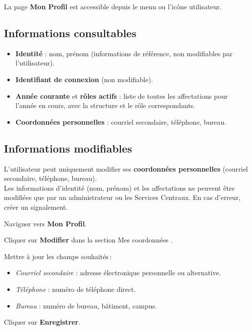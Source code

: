 La page \textbf{Mon Profil} est accessible depuis le menu ou l'ic\^one utilisateur.

\subsection{Informations consultables}

\begin{itemize}
  \item \textbf{Identit\'e} : nom, pr\'enom (informations de r\'ef\'erence, non modifiables par l'utilisateur).
  \item \textbf{Identifiant de connexion} (non modifiable).
  \item \textbf{Ann\'ee courante} et \textbf{r\^oles actifs} : liste de toutes les affectations pour l'ann\'ee en cours, avec la structure et le r\^ole correspondants.
  \item \textbf{Coordonn\'ees personnelles} : courriel secondaire, t\'el\'ephone, bureau.
\end{itemize}

\subsection{Informations modifiables}

\begin{warnbox}
  L'utilisateur peut uniquement modifier ses \textbf{coordonn\'ees personnelles} (courriel secondaire, t\'el\'ephone, bureau). \\
  Les informations d'identit\'e (nom, pr\'enom) et les affectations ne peuvent \^etre modifi\'ees que par un administrateur ou les Services Centraux. En cas d'erreur, cr\'eer un signalement.
\end{warnbox}

\begin{steps}
  \item Naviguer vers \textbf{Mon Profil}.
  \item Cliquer sur \textbf{Modifier} dans la section \og Mes coordonn\'ees \fg{}.
  \item Mettre \`a jour les champs souhait\'es\,:
    \begin{itemize}
      \item \textit{Courriel secondaire} : adresse \'electronique personnelle ou alternative.
      \item \textit{T\'el\'ephone} : num\'ero de t\'el\'ephone direct.
      \item \textit{Bureau} : num\'ero de bureau, b\^atiment, campus.
    \end{itemize}
  \item Cliquer sur \textbf{Enregistrer}.
\end{steps}

